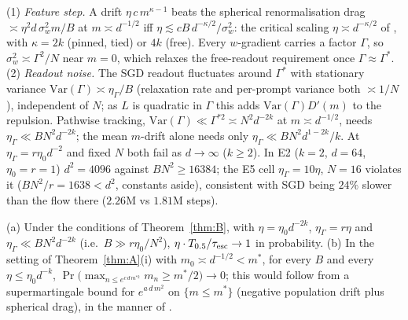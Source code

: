 \begin{remark}\label{rem:sgd}
(1) \emph{Feature step.} A drift $\eta\,c\,m^{\kappa-1}$ beats the spherical renormalisation drag $\asymp\eta^2d\,\sigma_w^2m/B$ at $m\asymp d^{-1/2}$ iff
$\eta\lesssim cB\,d^{-\kappa/2}/\sigma_w^2$: the critical scaling $\eta\asymp d^{-\kappa/2}$ of \citet{benarous2021online}, with $\kappa=2k$ (pinned, tied) or $4k$
(free). Every $w$-gradient carries a factor $\Gamma$, so $\sigma_w^2\asymp\Gamma^2/N$ near $m=0$, which relaxes the free-readout requirement once
$\Gamma\approx\Gamma^*$. (2) \emph{Readout noise.} The SGD readout fluctuates around $\Gamma^*$ with stationary variance $\mathrm{Var}(\Gamma)\asymp\eta_\Gamma/B$
(relaxation rate and per-prompt variance both $\asymp1/N$), independent of $N$; as $L$ is quadratic in $\Gamma$ this adds $\mathrm{Var}(\Gamma)D'(m)$ to the
repulsion. Pathwise tracking, $\mathrm{Var}(\Gamma)\ll\Gamma^{*2}\asymp N^2d^{-2k}$ at $m\asymp d^{-1/2}$, needs $\eta_\Gamma\ll BN^2d^{-2k}$; the mean $m$-drift alone needs
only $\eta_\Gamma\ll BN^2d^{1-2k}/k$. At $\eta_\Gamma=r\eta_0d^{-2}$ and fixed $N$ both fail as $d\to\infty$ ($k\ge2$). In E2 ($k=2$, $d=64$, $\eta_0=r=1$) $d^2=4096$ against $BN^2\ge16384$; the E5 cell
$\eta_\Gamma=10\eta$, $N=16$ violates it ($BN^2/r=1638<d^2$, constants aside), consistent with SGD being $24\%$ slower than the flow there ($2.26$M vs $1.81$M steps).
\end{remark}

\begin{conjecture}\label{conj:sgd}
(a) Under the conditions of Theorem~\ref{thm:B}, with $\eta=\eta_0d^{-2k}$, $\eta_\Gamma=r\eta$ and $\eta_\Gamma\ll BN^2d^{-2k}$ (i.e.\ $B\gg r\eta_0/N^2$),
$\eta\cdot T_{0.5}/\tau_{\rm esc}\to1$ in probability. (b) In the setting of Theorem~\ref{thm:A}(i) with $m_0\asymp d^{-1/2}<m^*$, for every $B$ and every
$\eta\le\eta_0d^{-k}$, $\Pr\big(\max_{n\le e^{c\,d\,m^{*2}}}m_n\ge m^*/2\big)\to0$; this would follow from a supermartingale bound for $e^{a\,d\,m^2}$ on
$\{m\le m^*\}$ (negative population drift plus spherical drag), in the manner of \citet{benarous2021online}.
\end{conjecture}
